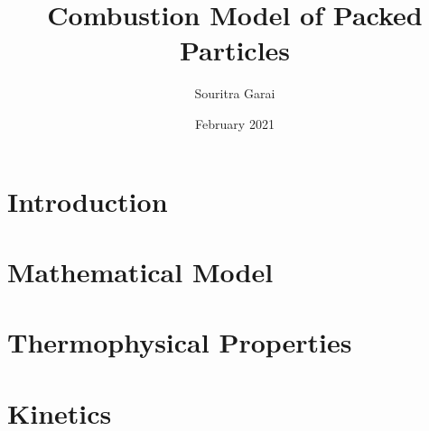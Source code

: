 \documentclass{article}
\title{Combustion Model of Packed Particles}
\author{Souritra Garai}
\date{February 2021}
\begin{document}
\maketitle

\section{Introduction}

\section{Mathematical Model}





\section{Thermophysical Properties}



\section{Kinetics}


\end{document}

